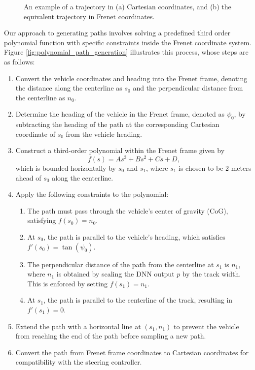 \begin{figure}[htb!]
    \centering
    
    \caption[An example of a trajectory in Cartestian and Frenet coordinates]{An example of a trajectory in (a) Cartesian coordinates, and (b) the equivalent trajectory in Frenet coordinates.}
    \label{fig:frenet_frame}
\end{figure}


Our approach to generating paths involves solving a predefined third order polynomial function with specific constraints inside the Frenet coordinate system.
Figure \ref{fig:polynomial_path_generation} illustrates this process, whose steps are as follows: 

\begin{enumerate}
    \item Convert the vehicle coordinates and heading into the Frenet frame, denoting the distance along the centerline as $s_0$ and the perpendicular distance from the centerline as $n_0$.
    \item Determine the heading of the vehicle in the Frenet frame, denoted as $\psi_0$, by subtracting the heading of the path at the corresponding Cartesian coordinate of $s_0$ from the vehicle heading.
    \item Construct a third-order polynomial within the Frenet frame given by
        \begin{equation}
        f(s) = As^3 + Bs^2 + Cs + D,
        \end{equation}
    which is bounded horizontally by $s_0$ and $s_1$, where $s_1$ is chosen to be 2 meters ahead of $s_0$ along the centerline.
    \item Apply the following constraints to the polynomial:
    \begin{enumerate}
        \item The path must pass through the vehicle's center of gravity (CoG), satisfying $f(s_0) = n_0$.
        \item At $s_0$, the path is parallel to the vehicle's heading, which satisfies $f'(s_0) = \tan(\psi_0)$.
        \item The perpendicular distance of the path from the centerline at $s_1$ is $n_1$, where $n_1$ is obtained by scaling the DNN output $p$ by the track width.
        This is enforced by setting $f(s_1) = n_1$.
        \item At $s_1$, the path is parallel to the centerline of the track, resulting in $f'(s_1) = 0$.
    \end{enumerate}
    \item Extend the path with a horizontal line at $(s_1,n_1)$ to prevent the vehicle from reaching the end of the path before sampling a new path.
    \item Convert the path from Frenet frame coordinates to Cartesian coordinates for compatibility with the steering controller.
\end{enumerate}


